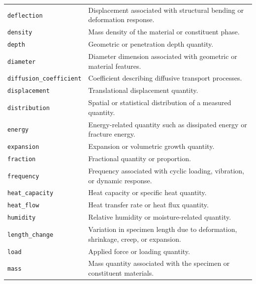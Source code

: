 \documentclass[11pt]{book}
\begin{document}
{\begin{longtable}{p{}p{}}
\texttt{deflection} &
Displacement associated with structural bending or deformation response. \\

\texttt{density} &
Mass density of the material or constituent phase. \\

\texttt{depth} &
Geometric or penetration depth quantity. \\

\texttt{diameter} &
Diameter dimension associated with geometric or material features. \\

\texttt{diffusion\_coefficient} &
Coefficient describing diffusive transport processes. \\

\texttt{displacement} &
Translational displacement quantity. \\

\texttt{distribution} &
Spatial or statistical distribution of a measured quantity. \\

\texttt{energy} &
Energy-related quantity such as dissipated energy or fracture energy. \\

\texttt{expansion} &
Expansion or volumetric growth quantity. \\

\texttt{fraction} &
Fractional quantity or proportion. \\

\texttt{frequency} &
Frequency associated with cyclic loading, vibration, or dynamic response. \\

\texttt{heat\_capacity} &
Heat capacity or specific heat quantity. \\

\texttt{heat\_flow} &
Heat transfer rate or heat flux quantity. \\

\texttt{humidity} &
Relative humidity or moisture-related quantity. \\

\texttt{length\_change} &
Variation in specimen length due to deformation, shrinkage, creep, or expansion. \\

\texttt{load} &
Applied force or loading quantity. \\

\texttt{mass} &
Mass quantity associated with the specimen or constituent materials. \\


\end{longtable}}
\end{document}
